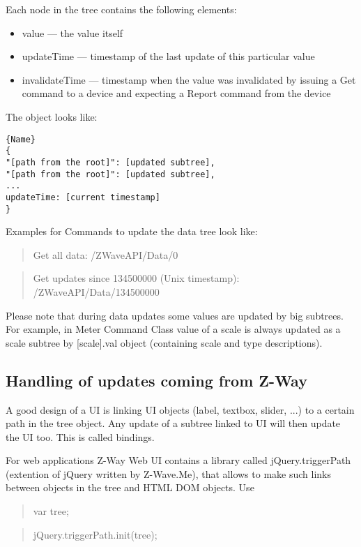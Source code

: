Each node in the tree contains the following elements:
\begin{itemize}
\item value — the value itself
\item updateTime — timestamp of the last update of this particular value
\item invalidateTime — timestamp when the value was invalidated by issuing a Get 
command to a device and expecting a Report command from the device
\end{itemize}

The object looks like:
\begin{lstlisting}[caption=JSON Data Structure]{Name}
{
"[path from the root]": [updated subtree],
"[path from the root]": [updated subtree],
...
updateTime: [current timestamp]
}
\end{lstlisting}

Examples for Commands to update the data tree look like:

\begin{quote}Get all data: /ZWaveAPI/Data/0\end{quote}

\begin{quote} Get updates since 134500000 (Unix timestamp): /ZWaveAPI/Data/134500000\end{quote}

Please note that during data updates some values are updated by big subtrees. For example, 
in Meter Command Class value of a scale is always updated as a scale subtree by 
[scale].val object (containing scale and type descriptions).


\subsection{Handling of updates coming from Z-Way}

A good design of a UI is linking UI objects (label, textbox, slider, ...) to a certain 
path in the tree object. Any update of a subtree linked to UI will then update the UI too. 
This is called bindings.

For web applications Z-Way Web UI contains a library called jQuery.triggerPath 
(extention of jQuery written by Z-Wave.Me), that allows to make such links between 
objects in the tree and HTML DOM objects. Use

\begin{quote}var tree;\end{quote}
\begin{quote}jQuery.triggerPath.init(tree);\end{quote}

